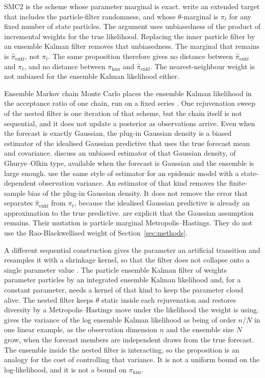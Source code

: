 SMC2 is the scheme whose parameter marginal is exact. \citet[Proposition~1]{chopin2012} write an extended target that includes the particle-filter randomness, and whose \(\theta\)-marginal is \(\pi_t\) for any fixed number of state particles. The argument uses unbiasedness of the product of incremental weights for the true likelihood. Replacing the inner particle filter by an ensemble Kalman filter removes that unbiasedness. The marginal that remains is \(\hat{\pi}_{\mathrm{enkf}}\), not \(\pi_t\). The same proposition therefore gives no distance between \(\hat{\pi}_{\mathrm{enkf}}\) and \(\pi_t\), and no distance between \(\pi_{\mathrm{knn}}\) and \(\hat{\pi}_{\mathrm{enkf}}\). The nearest-neighbour weight is not unbiased for the ensemble Kalman likelihood either.

Ensemble Markov chain Monte Carlo places the ensemble Kalman likelihood in the acceptance ratio of one chain, run on a fixed series \citep{drovandi2022}. One rejuvenation sweep of the nested filter is one iteration of that scheme, but the chain itself is not sequential, and it does not update a posterior as observations arrive. Even when the forecast is exactly Gaussian, the plug-in Gaussian density is a biased estimator of the idealised Gaussian predictive that uses the true forecast mean and covariance. \citet[Section~3.3]{drovandi2022} discuss an unbiased estimator of that Gaussian density, of Ghurye--Olkin type, available when the forecast is Gaussian and the ensemble is large enough. \citet{temfack2026} use the same style of estimator for an epidemic model with a state-dependent observation variance. An estimator of that kind removes the finite-sample bias of the plug-in Gaussian density. It does not remove the error that separates \(\hat{\pi}_{\mathrm{enkf}}\) from \(\pi_t\), because the idealised Gaussian predictive is already an approximation to the true predictive. \citet{temfack2026} are explicit that the Gaussian assumption remains. Their mutation is particle marginal Metropolis--Hastings. They do not use the Rao-Blackwellised weight of Section~\ref{sec:methods}.

A different sequential construction gives the parameter an artificial transition and resamples it with a shrinkage kernel, so that the filter does not collapse onto a single parameter value \citep{liu2001}. The particle ensemble Kalman filter of \citet{katzfuss2018} weights parameter particles by an integrated ensemble Kalman likelihood and, for a constant parameter, needs a kernel of that kind to keep the parameter cloud alive. The nested filter keeps \(\theta\) static inside each rejuvenation and restores diversity by a Metropolis--Hastings move under the likelihood the weight is using. \citet[Proposition~2]{katzfuss2018} gives the variance of the log ensemble Kalman likelihood as being of order \(n/N\) in one linear example, as the observation dimension \(n\) and the ensemble size \(N\) grow, when the forecast members are independent draws from the true forecast. The ensemble inside the nested filter is interacting, so the proposition is an analogy for the cost of controlling that variance. It is not a uniform bound on the log-likelihood, and it is not a bound on \(\pi_{\mathrm{knn}}\).

